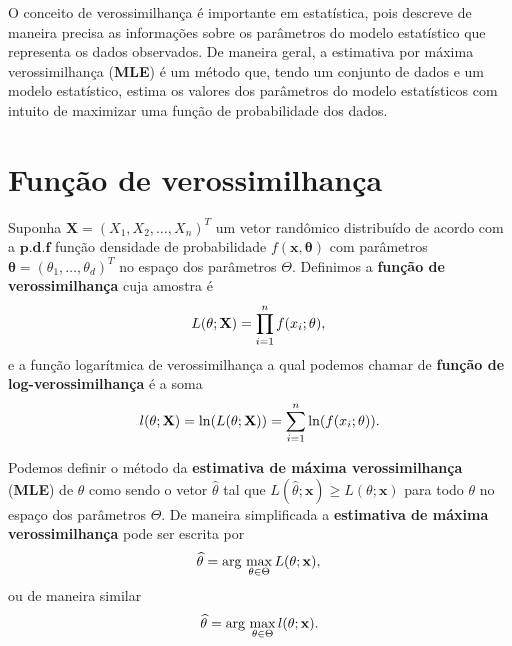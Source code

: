 O conceito de verossimilhança é importante em estatística, pois descreve de maneira precisa as informações sobre os parâmetros do modelo estatístico que representa os dados observados. De maneira geral, a estimativa por máxima verossimilhança (\textbf{MLE}) é um método que, tendo um conjunto de dados e um modelo estatístico, estima os valores dos parâmetros do modelo estatísticos com intuito de maximizar uma função de probabilidade dos dados. 

\section{Função de verossimilhança}

Suponha $\mathbf{X}=(X_1,X_2,\dots,X_n)^T$ um vetor randômico distribuído de acordo com a $\mathbf{p.d.f}$ função densidade de probabilidade $f(\mathbf{x},\mathbf{\theta})$ com parâmetros $\mathbf{\theta}=(\theta_1,\dots,\theta_d)^T$ no espaço dos parâmetros $\Theta$. Definimos  a \textbf{função de verossimilhança} cuja amostra é 
\begin{equation}\label{cap_acf_14}
    L(\theta;\mathbf{X}) = \prod_{i=1}^{n}f(x_i;\theta), \\
\end{equation}
e a função logarítmica de verossimilhança a qual podemos chamar de  \textbf{função de log-verossimilhança} é a soma
\begin{equation}\label{cap_acf_15}
	l(\theta;\mathbf{X})= \ln(L(\theta;\mathbf{X})) = \sum_{i=1}^{n}\ln(f(x_i;\theta)). \\
\end{equation}

Podemos definir o método da \textbf{estimativa de máxima verossimilhança} (\textbf{MLE}) de $\theta$ como sendo o vetor $\widehat{\theta}$ tal que $L(\widehat{\theta};\mathbf{x})\ge L(\theta;\mathbf{x})$ para todo $\theta$ no espaço dos parâmetros $\Theta$. De maneira simplificada a \textbf{estimativa de máxima verossimilhança} pode ser escrita por 
\begin{equation}\label{cap_acf_16}
    \widehat{\theta}= \text{arg}\,\max\limits_{\theta\in\Theta}L(\theta;\mathbf{x}),\\
\end{equation}
ou de maneira similar 
\begin{equation}\label{cap_acf_17}
    \widehat{\theta}= \text{arg}\,\max\limits_{\theta\in\Theta}l(\theta;\mathbf{x}).\\
\end{equation}


